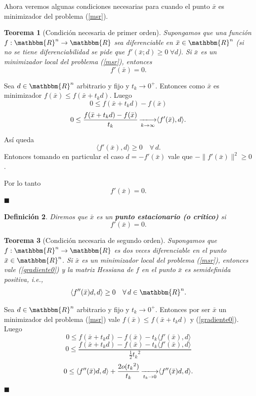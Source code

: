 \documentclass[a4paper,12pt]{report}
\newcommand{\la}{\langle}
\newcommand{\ra}{\rangle}
\newcommand{\RR}{\mathbbm{R}}
\newcommand{\Rn}{\RR^n}
\newcommand{\bx}{\bar{x}}
\newcommand{\arr}{\rightarrow}
\newcommand{\larr}{\longrightarrow}
\newtheorem{teo}{Teorema}[section]
\newtheorem{defi}[teo]{Definici\'on}
\newenvironment{dem}{\vspace*{-0.1cm}{\it Demostraci\'on:}}{\hfill
$\blacksquare$\\}
\begin{document}
Ahora veremos algunas condiciones necesarias para cuando el punto $\bx$ es minimizador del problema (\ref{msr}).

\begin{teo}[Condici\'on necesaria de primer orden]
Supongamos que una funci\'on $f:\Rn \arr \RR$ sea diferenciable en $\bx \in \Rn$ (si no se tiene diferenciabilidad se pide que $f'(\bx;d)\geq 0\; \forall d$). Si $\bx$ es un minimizador local del problema (\ref{msr}), entonces 
\begin{equation} \label{gradiente0}
f'(\bx)=0.
\end{equation} 
\end{teo}

\begin{dem}
Sea $d\in \Rn$ arbitrario y fijo y $t_k \arr 0^+$. Entonces como $\bx$ es minimizador $f(\bx)\leq f(\bx+t_k d)$.
Luego $$0\leq f(\bx+t_k d)-f(\bx)$$
$$0\leq \frac{f(\bx+t_k d)-f(\bx)}{t_k}\mathop{-\hspace{-3pt}-\hspace{-6pt}\larr}_{k\arr\infty} \la f'(\bx),d\ra.$$

As\'i queda $$\la f'(\bx),d\ra\geq 0\quad\forall\,d.$$
Entonces tomando en particular el caso $d=-f' (\bx)$ vale que $-\| f'(\bx)\|^2 \geq 0$.

Por lo tanto $$f'(\bx)=0.$$ 
\end{dem}


\begin{defi}
Diremos que $\bx$ es un \textbf{punto estacionario (o cr\'itico)} si $$f'(\bx)=0.$$
\end{defi}


\begin{teo}[Condici\'on necesaria de segundo orden]
Supongamos que \linebreak $f:\Rn\arr\RR$ es dos veces diferenciable en el punto $\bx \in \Rn$. Si $\bx$ es un minimizador local del problema (\ref{msr}), entonces vale (\ref{gradiente0}) y la matriz Hessiana de $f$ en el punto $\bx$ es semidefinida positiva, i.e., 
\begin{equation} \label{derivada2}
\la f''(\bx)d,d\ra \geq 0\quad \forall\,d \in \Rn.
\end{equation}
\end{teo}
\begin{dem}
Sea $d \in \Rn$ arbitrario y fijo y $t_k \arr 0^+$. Entonces por ser $\bx$ un minimizador del problema (\ref{msr}) vale $f(\bx)\leq f(\bx+t_k d)$ y (\ref{gradiente0}).
Luego $$0\leq f(\bx + t_k d) - f(\bx) -t_k \la f'(\bx),d\ra$$
$$0\leq \frac{f(\bx + t_k d) - f(\bx) -t_k \la f'(\bx),d\ra}{\frac{1}{2} {t_k}^2}$$
$$0\leq \la f''(\bx)d,d\ra + \frac{2o({t_k}^2)}{t_k} \mathop{-\hspace{-3pt}-\hspace{-6pt}\longrightarrow}_{t_k\arr 0} \la f''(\bx)d,d\ra.$$
\end{dem}
\end{document}

